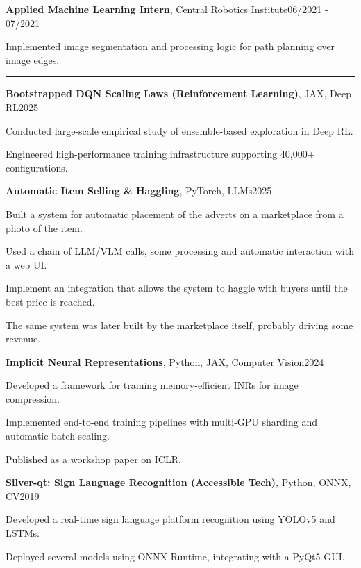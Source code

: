 \documentclass[11pt, a4paper]{article}
\newcommand{\entrytitle}[3]{
    \vspace{-1mm}\noindent\textbf{#1}, #2\hfill#3\vspace{-2mm}
}
\newcommand{\sectiontitle}[1]{\vspace{1mm}{\color{primaryColor}\noindent\textbf{#1}}\vspace{1.5mm}\hrule\vspace{1mm}}
\begin{document}
\entrytitle{Applied Machine Learning Intern}{Central Robotics Institute}{06/2021 - 07/2021}
\begin{details}
    \item Implemented image segmentation and processing logic for path planning over image edges.
\end{details}

\sectiontitle{Selected Projects}

\entrytitle{Bootstrapped DQN Scaling Laws (Reinforcement Learning)}{JAX, Deep RL}{2025}
\begin{details}
    \item Conducted large-scale empirical study of ensemble-based exploration in Deep RL.
    \item Engineered high-performance training infrastructure supporting 40,000+ configurations.
\end{details}

\entrytitle{Automatic Item Selling \& Haggling}{PyTorch, LLMs}{2025}
\begin{details}
    \item Built a system for automatic placement of the adverts on a marketplace from a photo of the item.
    \item Used a chain of LLM/VLM calls, some processing and automatic interaction with a web UI.
    \item Implement an integration that allows the system to haggle with buyers until the best price is reached.
    \item The same system was later built by the marketplace itself, probably driving some revenue.
\end{details}

\entrytitle{Implicit Neural Representations}{Python, JAX, Computer Vision}{2024}
\begin{details}
    \item Developed a framework for training memory-efficient INRs for image compression.
    \item Implemented end-to-end training pipelines with multi-GPU sharding and automatic batch scaling.
    \item Published as a workshop paper on ICLR.
\end{details}

\entrytitle{Silver-qt: Sign Language Recognition (Accessible Tech)}{Python, ONNX, CV}{2019}
\begin{details}
    \item Developed a real-time sign language platform recognition using YOLOv5 and LSTMs.
    \item Deployed several models using ONNX Runtime, integrating with a PyQt5 GUI.
\end{details}
\end{document}
